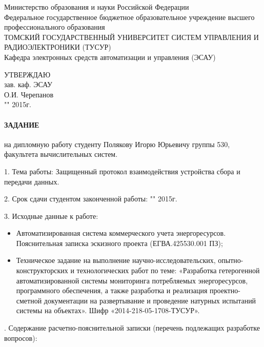 \newpage
{}

\begin{center}
 Министерство образования и науки Российской Федерации\\
 Федеральное государственное бюджетное образовательное учреждение высшего профессионального образования\\
 ТОМСКИЙ ГОСУДАРСТВЕННЫЙ УНИВЕРСИТЕТ СИСТЕМ УПРАВЛЕНИЯ И РАДИОЭЛЕКТРОНИКИ (ТУСУР)\\
 Кафедра электронных средств автоматизации и управления (ЭСАУ)\\
\end{center}

\begin{flushright}
 \begin{minipage}{0.4\textwidth}
  УТВЕРЖДАЮ \\
  зав. каф. ЭСАУ \\
  \underline{\hspace{2.5cm}}О.И. Черепанов \\
  "\underline{\hspace{1cm}}"\underline{\hspace{3cm}} 2015г.
 \end{minipage}
\end{flushright}

\vspace{1cm}

\paragraph*{\hfill ЗАДАНИЕ \hfill}

на дипломную работу студенту Полякову Игорю Юрьевичу группы 530, факультета вычислительных систем.

1. Тема работы: Защищенный протокол взаимодействия устройства сбора и передачи данных.

2. Срок сдачи студентом законченной работы: "\underline{\hspace{1cm}}"\underline{\hspace{3cm}} 2015г.

3. Исходные данные к работе:

\begin{itemize}
 \item Автоматизированная система коммерческого учета энергоресурсов. Пояснительная записка эскизного проекта (ЕГВА.425530.001 ПЗ);
 \item Техническое задание на выполнение научно-исследовательских, опытно-конструкторских и технологических работ по теме: «Разработка гетерогенной автоматизированной системы мониторинга потребляемых энергоресурсов, программного обеспечения, а также разработка и реализация проектно-сметной документации на развертывание и проведение натурных испытаний системы на объектах». Шифр «2014-218-05-1708-ТУСУР».
\end{itemize}
. Содержание расчетно-пояснительной записки (перечень подлежащих разработке вопросов):

